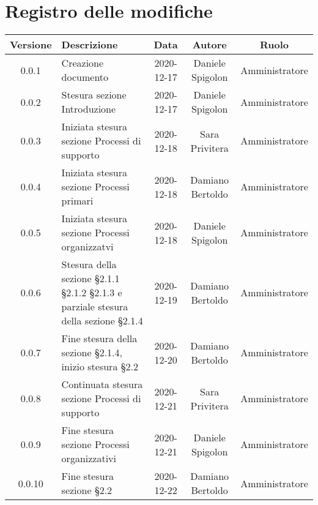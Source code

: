 \section*{Registro delle modifiche}

\begin{center}
	\begin{longtable}{|c|p{5cm}|c|c|c|}
	\hline
	\rowcolor{lighter-grayer}
	\textbf{Versione} & \textbf{Descrizione} & \textbf{Data} & \textbf{Autore} & \textbf{Ruolo} \\
	\hline
	\endfirsthead


	0.0.1 & Creazione documento & 2020-12-17 & Daniele Spigolon & Amministratore \\
	\hline
	0.0.2 & Stesura sezione Introduzione & 2020-12-17 & Daniele Spigolon & Amministratore \\
	\hline
	0.0.3 & Iniziata stesura sezione Processi di supporto & 2020-12-18 & Sara Privitera & Amministratore \\
	\hline	
	0.0.4 & Iniziata stesura sezione Processi primari & 2020-12-18 & Damiano Bertoldo & Amministratore \\
	\hline
	0.0.5 & Iniziata stesura sezione Processi organizzatvi & 2020-12-18 & Daniele Spigolon & Amministratore \\
	\hline
	0.0.6 & Stesura della sezione §2.1.1 §2.1.2 §2.1.3 e parziale stesura della sezione §2.1.4 & 2020-12-19 & Damiano Bertoldo & Amministratore \\
	\hline
	0.0.7 & Fine stesura della sezione §2.1.4, inizio stesura §2.2 & 2020-12-20 & Damiano Bertoldo & Amministratore \\
	\hline
	0.0.8 & Continuata stesura sezione Processi di supporto & 2020-12-21 & Sara Privitera & Amministratore \\
	\hline
	0.0.9 & Fine stesura sezione Processi organizzativi & 2020-12-21 & Daniele Spigolon & Amministratore \\
	\hline
	0.0.10 & Fine stesura sezione §2.2 & 2020-12-22 & Damiano Bertoldo & Amministratore \\
	\hline
	

	\end{longtable}
\end{center}